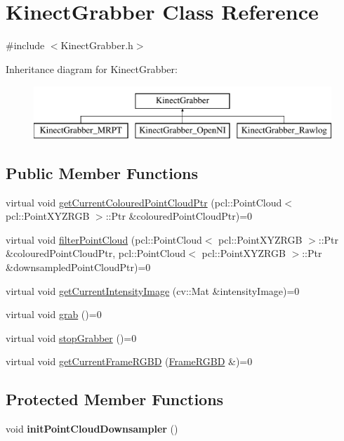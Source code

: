 \hypertarget{class_kinect_grabber}{
\section{KinectGrabber Class Reference}
\label{class_kinect_grabber}
}


{\ttfamily \#include $<$KinectGrabber.h$>$}

Inheritance diagram for KinectGrabber:\begin{figure}[H]
\begin{center}
\leavevmode
\includegraphics[height=2.000000cm]{class_kinect_grabber}
\end{center}
\end{figure}
\subsection*{Public Member Functions}
\begin{DoxyCompactItemize}
\item 
virtual void \hyperlink{class_kinect_grabber_a053e560dfd15e6123d19e4aa20b19585}{getCurrentColouredPointCloudPtr} (pcl::PointCloud$<$ pcl::PointXYZRGB $>$::Ptr \&colouredPointCloudPtr)=0
\item 
virtual void \hyperlink{class_kinect_grabber_a3faafcbdbb136dd2c6b51d51eed9e147}{filterPointCloud} (pcl::PointCloud$<$ pcl::PointXYZRGB $>$::Ptr \&colouredPointCloudPtr, pcl::PointCloud$<$ pcl::PointXYZRGB $>$::Ptr \&downsampledPointCloudPtr)=0
\item 
virtual void \hyperlink{class_kinect_grabber_a47a54afb0a188cdd02f3cf79d503b3dd}{getCurrentIntensityImage} (cv::Mat \&intensityImage)=0
\item 
virtual void \hyperlink{class_kinect_grabber_a0274f336f9aee07bca08bd673cf9377a}{grab} ()=0
\item 
virtual void \hyperlink{class_kinect_grabber_af7d0fcdc2f85f84cb38469095882d688}{stopGrabber} ()=0
\item 
virtual void \hyperlink{class_kinect_grabber_abca25bbc3ddc8bc99dc1c84df48ae9f2}{getCurrentFrameRGBD} (\hyperlink{class_frame_r_g_b_d}{FrameRGBD} \&)=0
\end{DoxyCompactItemize}
\subsection*{Protected Member Functions}
\begin{DoxyCompactItemize}
\item 
\hypertarget{class_kinect_grabber_aa3e6643ea33d0cbf53ed6b8b67689730}{
void {\bfseries initPointCloudDownsampler} ()}
\label{class_kinect_grabber_aa3e6643ea33d0cbf53ed6b8b67689730}

\end{DoxyCompactItemize}
